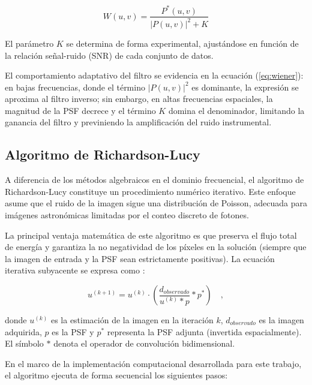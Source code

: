 \begin{equation}
    \label{eq:wiener}
    W(u,v) = \frac{P^*(u,v)}{|P(u,v)|^2 + K}
\end{equation}

El parámetro $K$ se determina de forma experimental, ajustándose en función de la relación señal-ruido (SNR) de cada conjunto de datos. 

El comportamiento adaptativo del filtro se evidencia en la ecuación (\ref{eq:wiener}): en bajas frecuencias, donde el término $|P(u,v)|^2$ es dominante, la expresión se aproxima al filtro inverso; sin embargo, en altas frecuencias espaciales, la magnitud de la PSF decrece y el término $K$ domina el denominador, limitando la ganancia del filtro y previniendo la amplificación del ruido instrumental.

\subsection{Algoritmo de Richardson-Lucy}

A diferencia de los métodos algebraicos en el dominio frecuencial, el algoritmo de Richardson-Lucy \cite{Lucy1974} constituye un procedimiento numérico iterativo. Este enfoque asume que el ruido de la imagen sigue una distribución de Poisson, adecuada para imágenes astronómicas limitadas por el conteo discreto de fotones.

La principal ventaja matemática de este algoritmo es que preserva el flujo total de energía y garantiza la no negatividad de los píxeles en la solución (siempre que la imagen de entrada y la PSF sean estrictamente positivas). La ecuación iterativa subyacente se expresa como \cite{richardsonBayesianBasedIterativeMethod1972}:

\begin{equation}
    u^{(k+1)} = u^{(k)} \cdot \left( \frac{d_{observado}}{u^{(k)} \ast p} \ast p^* \right) \quad,
\end{equation}

donde $u^{(k)}$ es la estimación de la imagen en la iteración $k$, $d_{observado}$ es la imagen adquirida, $p$ es la PSF y $p^*$ representa la PSF adjunta (invertida espacialmente). El símbolo $\ast$ denota el operador de convolución bidimensional.

En el marco de la implementación computacional desarrollada para este trabajo, el algoritmo ejecuta de forma secuencial los siguientes pasos:

